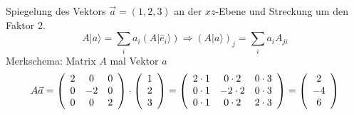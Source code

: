 \documentclass{article}
\begin{document}
Spiegelung des Vektors $\vec{a}=(1,2,3)$ an der $xz$-Ebene und Streckung um den Faktor 2.
\begin{equation*}
    A|a\rangle = \sum_{i} a_i\left(A|\hat{e}_i\rangle\right) \Rightarrow \left(A|a\rangle\right)_j = \sum_{i} a_iA_{ji}
\end{equation*}
Merkschema: Matrix $A$ mal Vektor $a$
\begin{equation*}
    A\vec{a} = \left(\begin{array}{c c c}
        2 & 0 & 0\\
        0 & -2 & 0\\
        0 & 0 & 2\\
    \end{array}\right) \cdot \left(\begin{array}{c}
        1\\
        2\\
        3\\
    \end{array}\right) = \left(\begin{array}{c c c}
        2\cdot 1 & 0\cdot 2 & 0\cdot 3\\
        0\cdot 1 & -2\cdot 2 & 0\cdot 3\\
        0\cdot 1 & 0\cdot 2 & 2\cdot 3\\
    \end{array}\right) = \left(\begin{array}{c}
        2\\
        -4\\
        6\\
    \end{array}\right)
\end{equation*}
\end{document}
